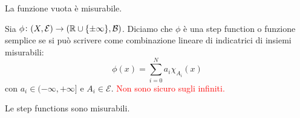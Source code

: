 \begin{oss}
	La funzione vuota è misurabile.
\end{oss}

\begin{definition}
	Sia $ \phi\colon (X,\mathcal{E}) \to (\mathbb{R} \cup \{\pm\infty\}, \mathcal{B}) $. Diciamo che $ \phi $ è una step function o funzione semplice se si può scrivere come combinazione lineare di indicatrici di insiemi misurabili:
	\[ 
        \phi(x) = \sum_{i=0}^N a_i \chi_{A_i}(x) 
    \]
	con $ a_i \in (-\infty, +\infty] $ e $ A_i \in \mathcal{E} $. \textcolor{red}{Non sono sicuro sugli infiniti.}
\end{definition}

\begin{oss}
	Le step functions sono misurabili.
\end{oss}

